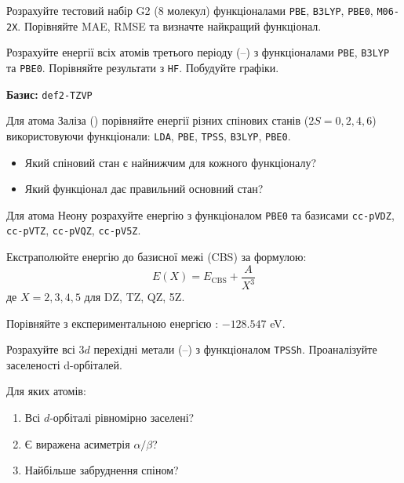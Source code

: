 \begin{tasks}
\item Розрахуйте тестовий набір G2 (8 молекул) функціоналами \texttt{PBE}, \texttt{B3LYP}, \texttt{PBE0}, \texttt{M06-2X}. Порівняйте MAE, RMSE та визначте найкращий функціонал.

\item Розрахуйте енергії всіх атомів третього періоду (--) з функціоналами \texttt{PBE}, \texttt{B3LYP} та \texttt{PBE0}. Порівняйте результати з \texttt{HF}. Побудуйте графіки.

\textbf{Базис:} \texttt{def2-TZVP}

\item Для атома Заліза () порівняйте енергії різних спінових станів ($2S = 0, 2, 4, 6$) використовуючи функціонали: \texttt{LDA}, \texttt{PBE}, \texttt{TPSS}, \texttt{B3LYP}, \texttt{PBE0}.

\begin{itemize}
    \item Який спіновий стан є найнижчим для кожного функціоналу?
    \item Який функціонал дає правильний основний стан?
\end{itemize}

\item Для атома Неону розрахуйте енергію з функціоналом \texttt{PBE0} та базисами \texttt{cc-pVDZ}, \texttt{cc-pVTZ}, \texttt{cc-pVQZ}, \texttt{cc-pV5Z}.

Екстраполюйте енергію до базисної межі (CBS) за формулою:
\[
E(X) = E_{\text{CBS}} + \frac{A}{X^3}
\]
де $X = 2, 3, 4, 5$ для DZ, TZ, QZ, 5Z.

Порівняйте з експериментальною енергією : $-128.547$ eV.

\item Розрахуйте всі $3d$ перехідні метали (--) з функціоналом \texttt{TPSSh}. Проаналізуйте заселеності d-орбіталей.

Для яких атомів:
\begin{enumerate}
    \item Всі $d$-орбіталі рівномірно заселені?
    \item Є виражена асиметрія $\alpha/\beta$?
    \item Найбільше забруднення спіном?
\end{enumerate}


\end{tasks}


